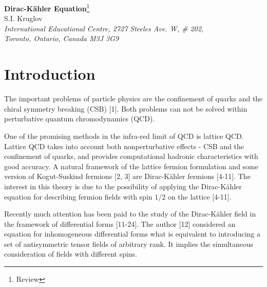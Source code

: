 \documentclass[a4paper,12pt]{article}
\begin{document}
\begin{center}
{\bf Dirac-K\"ahler Equation}\footnote{Review}\\
\vspace{5mm}
 S.I. Kruglov \\
\vspace{5mm}
\textit{International Educational Centre, 2727 Steeles Ave. W, \# 202, \\
Toronto, Ontario, Canada M3J 3G9}
\end{center}

\begin{abstract}
Tensor and matrix formulations of Dirac-K\"ahler equation for massive and
massless fields are considered. The equation matrices obtained are simple
linear combinations of matrix elements in the 16-dimensional space. The
projection matrix-dyads defining all the 16 independent equation solutions
are found. A method of computing the traces of 16-dimensional
Petiau-Duffin-Kemmer matrix product is considered. It is shown that the
symmetry group of the Dirac-K\"ahler tensor fields is $SO(4,2)$. The
conservation currents corresponding this symmetry are constructed.
Supersymmetry of the Dirac-K\"ahler fields with tensor and spinor parameters
is analyzed. We show the possibility of constructing a gauge model of
interacting Dirac-K\"ahler fields where the gauge group is the noncompact
group under consideration.
\end{abstract}

\section{Introduction}

The important problems of particle physics are the confinement of quarks and
the chiral symmetry breaking (CSB) [1]. Both problems can not be solved
within perturbative quantum chromodynamics (QCD).

One of the promising methods in the infra-red limit of QCD is lattice QCD.
Lattice QCD takes into account both nonperturbative effects - CSB and the
confinement of quarks, and provides computational hadronic characteristics
with good accuracy. A natural framework of the lattice fermion formulation
and some version of Kogut-Suskind fermions [2, 3] are Dirac-K\"ahler
fermions [4-11]. The interest in this theory is due to the possibility of
applying the Dirac-K\"ahler equation for describing fermion fields with spin
$1/2$ on the lattice [4-11].

Recently much attention has been paid to the study of the Dirac-K\"ahler
field in the framework of differential forms [11-24]. The author [12]
considered an equation for inhomogeneous differential forms what is
equivalent to introducing a set of antisymmetric tensor fields of arbitrary
rank. It implies the simultaneous consideration of fields with different
spins.
\end{document}
